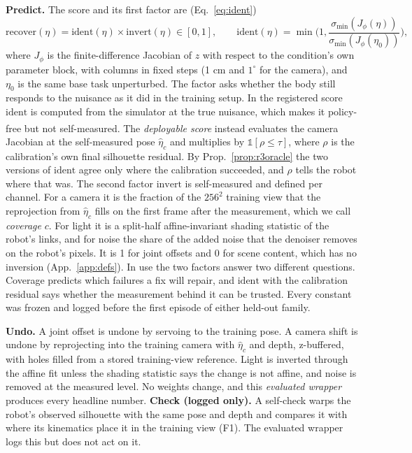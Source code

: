 \documentclass{article}
\newcommand{\ident}{\mathrm{ident}}
\newcommand{\invert}{\mathrm{invert}}
\newcommand{\recover}{\mathrm{recover}}
\newcommand{\ph}{\textsuperscript{\dag}}
\begin{document}
\textbf{Predict.} The score and its first factor are (Eq.~\ref{eq:ident})
\begin{equation}
\recover(\eta) = \ident(\eta) \times \invert(\eta) \in [0,1], \qquad
\ident(\eta) = \min\Big(1, \frac{\sigma_{\min}(J_\phi(\eta))}{\sigma_{\min}(J_\phi(\eta_0))}\Big),
\label{eq:score}
\end{equation}
where $J_\phi$ is the finite-difference Jacobian of $z$ with respect to the condition's own parameter block, with
columns in fixed steps (1 cm and $1^\circ$ for the camera), and $\eta_0$ is the same base task unperturbed. The factor
asks whether the body still responds to the nuisance as it did in the training setup. In the registered score
$\ident$ is computed from the simulator at the true nuisance, which makes it policy-free but not self-measured. The
\emph{deployable score}\ph{} instead evaluates the camera Jacobian at the self-measured pose $\hat\eta_c$ and multiplies
by $\mathbb{1}[\rho \le \tau]$, where $\rho$ is the calibration's own final silhouette residual. By
Prop.~\ref{prop:r3oracle} the two versions of $\ident$ agree only where the calibration succeeded, and $\rho$ tells the
robot where that was. The second factor $\invert$ is self-measured and defined per channel. For a camera it is the
fraction of the $256^2$ training view that the reprojection from $\hat\eta_c$ fills on the first frame after the
measurement, which we call \emph{coverage} $c$. For light it is a split-half affine-invariant shading statistic of the
robot's links, and for noise the share of the added noise that the denoiser removes on the robot's pixels. It is 1 for
joint offsets and 0 for scene content, which has no inversion (App.~\ref{app:defs}). In use the two factors answer
two different questions. Coverage predicts which failures a fix will repair, and $\ident$ with the calibration residual says
whether the measurement behind it can be trusted. Every constant was frozen and
logged before the first episode of either held-out family.

\textbf{Undo.} A joint offset is undone by servoing to the training pose. A camera shift is undone by reprojecting into
the training camera with $\hat\eta_c$ and depth, z-buffered, with holes filled from a stored training-view reference.
Light is inverted through the affine fit unless the shading statistic says the change is not affine, and noise is
removed at the measured level. No weights change, and this \emph{evaluated wrapper} produces every headline number.
\textbf{Check (logged only).} A self-check warps the robot's observed silhouette with the same pose and depth and
compares it with where its kinematics place it in the training view (F1). The evaluated wrapper logs this but does not
act on it.
\end{document}
